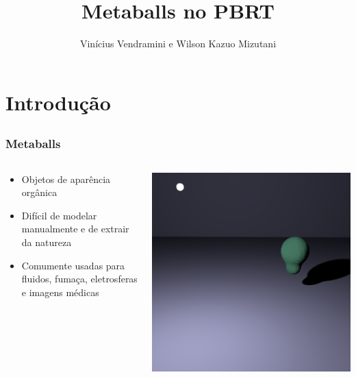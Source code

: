 \documentclass[brazil]{beamer}
\begin{document}
  \title{Metaballs no PBRT}
  \author{Vinícius Vendramini e Wilson Kazuo Mizutani}

  \frame{
    \titlepage
  }
  
  \section{Introdução}
  
    \subsection{}
    \begin{frame}
      \frametitle{Metaballs}
      \begin{columns}
        \begin{column}{0.58\textwidth}
          \begin{itemize}
            \item Objetos de aparência orgânica
            \item Difícil de modelar manualmente e de extrair da natureza
            \item Comumente usadas para fluidos, fumaça, eletrosferas e imagens médicas
          \end{itemize}
        \end{column}
        \begin{column}{0.4\textwidth}
          \begin{center}
            \includegraphics[width=1.0\textwidth]{imgs/metaball-preview.png}
          \end{center}
        \end{column}
      \end{columns}
    \end{frame}
\end{document}
